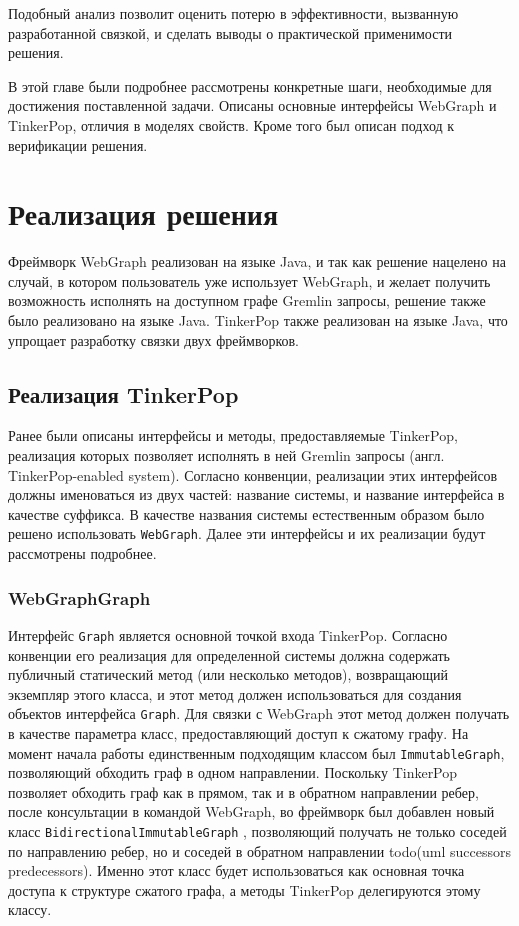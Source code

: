 \documentclass[times,specification,annotation]{itmo-student-thesis}
\begin{document}
Подобный анализ позволит оценить потерю в эффективности, вызванную разработанной связкой, и сделать выводы о практической применимости решения.

\chapterconclusion
В этой главе были подробнее рассмотрены конкретные шаги, необходимые для достижения поставленной задачи. Описаны основные интерфейсы WebGraph и TinkerPop, отличия в моделях свойств. Кроме того был описан подход к верификации решения.

\chapter{Реализация решения}

Фреймворк WebGraph реализован на языке Java, и так как решение нацелено на случай, в котором пользователь уже использует WebGraph, и желает получить возможность исполнять на доступном графе Gremlin запросы, решение также было реализовано на языке Java. TinkerPop также реализован на языке Java, что упрощает разработку связки двух фреймворков.

\section{Реализация TinkerPop}

Ранее были описаны интерфейсы и методы, предоставляемые TinkerPop, реализация которых позволяет исполнять в ней Gremlin запросы (англ. TinkerPop-enabled system). Согласно конвенции, реализации этих интерфейсов должны именоваться из двух частей: название системы, и название интерфейса в качестве суффикса. В качестве названия системы естественным образом было решено использовать \texttt{WebGraph}. Далее эти интерфейсы и их реализации будут рассмотрены подробнее. 

\subsection{WebGraphGraph}

Интерфейс \texttt{Graph} является основной точкой входа TinkerPop. Согласно конвенции его реализация для определенной системы должна содержать публичный статический метод (или несколько методов), возвращающий экземпляр этого класса, и этот метод должен использоваться для создания объектов интерфейса \texttt{Graph}.
Для связки с WebGraph этот метод должен получать в качестве параметра класс, предоставляющий доступ к сжатому графу. На момент начала работы единственным подходящим классом был \texttt{ImmutableGraph}, позволяющий обходить граф в одном направлении.
Поскольку TinkerPop позволяет обходить граф как в прямом, так и в обратном направлении ребер, после консультации в командой WebGraph, во фреймворк был добавлен новый класс \texttt{BidirectionalImmutableGraph} \cite{vigna-bidir}, позволяющий получать не только соседей по направлению ребер, но и соседей в обратном направлении todo(uml successors predecessors). Именно этот класс будет использоваться как основная точка доступа к структуре сжатого графа, а методы TinkerPop делегируются этому классу.
\end{document}
